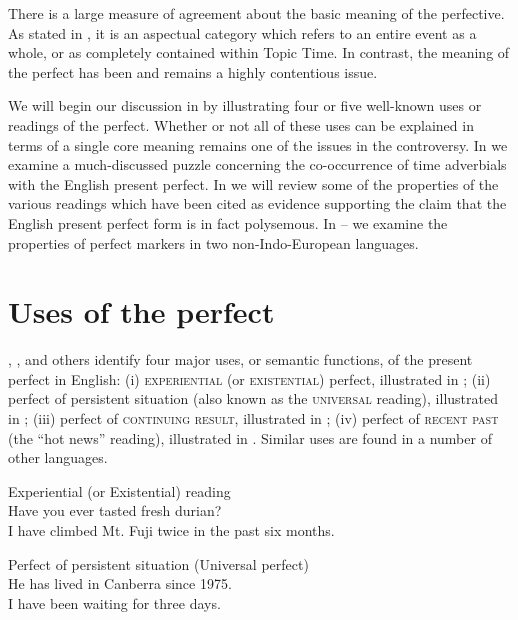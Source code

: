There is a large measure of agreement about the basic meaning of the perfective. As stated in , it is an aspectual category which refers to an entire event as a whole, or as completely contained within Topic Time. In contrast, the meaning of the perfect has been and remains a highly contentious issue.



We will begin our discussion in  by illustrating four or five well-known uses or readings of the perfect. Whether or not all of these uses can be explained in terms of a single core meaning remains one of the issues in the controversy. In  we examine a much-discussed puzzle concerning the co-occurrence of time adverbials with the English present perfect. In  we will review some of the properties of the various readings which have been cited as evidence supporting the claim that the English present perfect form is in fact polysemous. In -- we examine the properties of perfect markers in two non-Indo-European languages.


\section{Uses of the perfect}\label{sec:22.2}

\citet{McCawley1971}, \citet{Comrie1976}, and others identify four major uses, or semantic functions, of the present perfect in English: (i) \textsc{experiential} (or \textsc{existential}) perfect, illustrated in ; (ii) perfect of persistent situation (also known as the \textsc{universal} reading), illustrated in ; (iii) perfect of \textsc{continuing result}, illustrated in ; (iv) perfect of \textsc{recent past} (the “hot news” reading), illustrated in . Similar uses are found in a number of other languages.


\ea \label{ex:22.3}
Experiential (or Existential) reading\\
\ea Have you ever tasted fresh durian?\\
\ex I have climbed Mt. Fuji twice in the past six months.
                       \z
\z

\ea \label{ex:22.4}
Perfect of persistent situation (Universal perfect)\\
\ea He has lived in Canberra since 1975.\\
\ex I have been waiting for three days.
                       \z
\z

